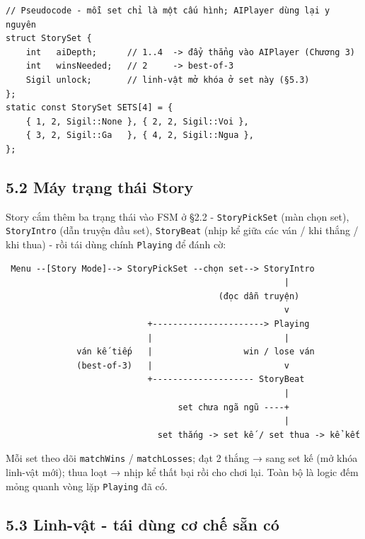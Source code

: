 \documentclass[11pt,a4paper]{article}
\begin{document}
\begin{verbatim}
// Pseudocode - mỗi set chỉ là một cấu hình; AIPlayer dùng lại y nguyên
struct StorySet {
    int   aiDepth;      // 1..4  -> đẩy thẳng vào AIPlayer (Chương 3)
    int   winsNeeded;   // 2     -> best-of-3
    Sigil unlock;       // linh-vật mở khóa ở set này (§5.3)
};
static const StorySet SETS[4] = {
    { 1, 2, Sigil::None }, { 2, 2, Sigil::Voi },
    { 3, 2, Sigil::Ga   }, { 4, 2, Sigil::Ngua },
};
\end{verbatim}

\subsection{5.2 Máy trạng thái Story}
\label{sec:story-fsm}

Story cắm thêm ba trạng thái vào FSM ở §2.2 - \texttt{StoryPickSet} (màn chọn set), \texttt{StoryIntro} (dẫn truyện đầu set), \texttt{StoryBeat} (nhịp kể giữa các ván / khi thắng / khi thua) - rồi tái dùng chính \texttt{Playing} để đánh cờ:

\begin{verbatim}
 Menu --[Story Mode]--> StoryPickSet --chọn set--> StoryIntro
                                                       |
                                          (đọc dẫn truyện)
                                                       v
                            +----------------------> Playing
                            |                          |
              ván kế tiếp   |                  win / lose ván
              (best-of-3)   |                          v
                            +-------------------- StoryBeat
                                                       |
                                  set chưa ngã ngũ ----+
                                                       |
                              set thắng -> set kế / set thua -> kể kết
\end{verbatim}

Mỗi set theo dõi \texttt{matchWins} / \texttt{matchLosses}; đạt 2 thắng → sang set kế (mở khóa linh-vật mới); thua loạt → nhịp kể thất bại rồi cho chơi lại. Toàn bộ là logic đếm mỏng quanh vòng lặp \texttt{Playing} đã có.

\subsection{5.3 Linh-vật - tái dùng cơ chế sẵn có}
\label{sec:story-sigil}
\end{document}
